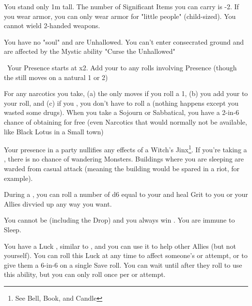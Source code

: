 {  
  You stand only 1m tall.  The number of Significant Items you can carry is -2. If you wear armor, you can only wear armor for "little people" (child-sized).  You cannot wield 2-handed weapons.

  You have no "soul" and are Unhallowed. You can't enter consecrated ground and are affected by the Mystic ability "Curse the Unhallowed"

  \
  Your Presence starts at \DCUP x2.  Add your \LVL to any rolls involving Presence (though the \UD still moves \DCDOWN on a natural 1 or 2)



  For any narcotics you take, (a) the \UD only moves \DCDOWN if you roll a 1, (b) you add your \LVL to your  roll, and (c) if you , you don't have to roll a  (nothing happens except you wasted some drugs).  When you take a Sojourn or Sabbatical, you have a 2-in-6 chance of obtaining   for free (even Narcotics that would normally not be available, like Black Lotus in a Small town)

  Your presence in a party nullifies any effects of a Witch's Jinx\footnote{See Bell, Book, and Candle}.  If you're taking a , there is no chance of wandering Monsters. Buildings where you are sleeping are warded from casual attack (meaning the building would be spared in a riot, for example). 

  During a , you can roll a number of d6 equal to your \LVL and heal \SUM Grit to you or your Allies divvied up any way you want.  

  You cannot be  (including the Drop) and you always win .  You are immune to Sleep.

  You have a Luck \UD, similar to , and you can use it to help other Allies (but not yourself).  You can roll this Luck \UD at any time to affect someone's \RO or \RB attempt, or to give them a 6-in-6 on a single Save roll.  You can wait until after they roll to use this ability, but you can only roll once per \RO or \RB attempt.

}
